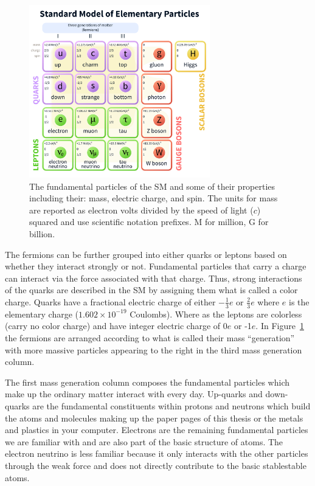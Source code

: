 \begin{figure}[htbp]
\centering
     \includegraphics[width=0.7\textwidth]{introduction/plots/Standard_Model_of_Elementary_Particles.pdf}
     \caption{
The fundamental particles of the SM and some of their properties including their:
mass, electric charge, and spin. The units for mass are reported as electron volts divided by
the speed of light ($c$) squared and use scientific notation prefixes.
M for million, G for billion.
     }
     \label{fig:sm_particles}
\end{figure}

The fermions can be further grouped into either quarks or leptons based on whether
they interact strongly or not. 
Fundamental particles that carry a charge can interact via the force associated with that charge.
Thus, strong interactions of the quarks are described in the SM by assigning them what is called a 
color charge. Quarks have a fractional electric charge of either $-\frac{1}{3}e$ or $\frac{2}{3}e$
where $e$ is the elementary charge ($1.602 \times 10^{-19}$ Coulombs).
Where as the leptons are colorless (carry no color charge) and
have integer electric charge of 0$e$ or -1$e$. In Figure~\ref{fig:sm_particles} the fermions are
arranged according to what is called their mass ``generation'' with more massive
particles appearing to the right in the third mass generation column.

The first
mass generation column composes the fundamental particles which make up the ordinary matter
interact with every day. Up-quarks and down-quarks are the fundamental constituents within
protons and neutrons which build the atoms and molecules
making up the paper pages of this thesis or the metals and plastics in your computer.
Electrons are the
remaining fundamental particles we are familiar with and are also part of the basic 
structure of atoms. The electron neutrino is less familiar because it only
interacts with the other particles through the weak force and does not directly
contribute to the basic stablestable  atoms.

